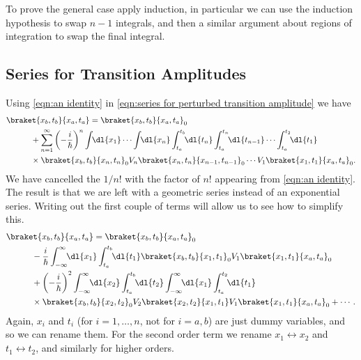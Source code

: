 \documentclass[fleqn]{NotesClass}
\begin{document}
    To prove the general case apply induction, in particular we can use the induction hypothesis to swap \(n - 1\) integrals, and then a similar argument about regions of integration to swap the final integral.
    
    \subsection{Series for Transition Amplitudes}
    Using \cref{eqn:an identity} in \cref{eqn:series for perturbed transition amplitude} we have
    \begin{align}\label{eqn:transition amplitude scattering series}
        &\braket{x_b, t_b}{x_a, t_a} = \braket{x_b, t_b}{x_a, t_a}_0 \notag\\
        &\quad\qquad {} + \sum_{n=1}^{\infty} \left( -\frac{i}{\hbar} \right)^n \int \!\! \dl{x_1} \dotsm \int \!\! \dl{x_n} \int_{t_a}^{t_b} \!\! \dl{t_n} \int_{t_a}^{t_n} \!\! \dl{t_{n-1}} \dotsm \int_{t_a}^{t_2} \!\! \dl{t_1} \notag\\
        &\quad\qquad \times \braket{x_b, t_b}{x_n, t_n}_0 V_n \braket{x_n, t_n}{x_{n-1}, t_{n-1}}_0 \dotsm V_1 \braket{x_1, t_1}{x_a, t_a}_0.
    \end{align}
    We have cancelled the \(1/n!\) with the factor of \(n!\) appearing from \cref{eqn:an identity}.
    The result is that we are left with a geometric series instead of an exponential series.
    Writing out the first couple of terms will allow us to see how to simplify this.
    \begin{align}
        &\braket{x_b, t_b}{x_a, t_a} = \braket{x_b, t_b}{x_a, t_a}_0\notag\\
        &\quad\qquad {} - \frac{i}{\hbar} \int_{-\infty}^{\infty} \!\! \dl{x_1} \int_{t_a}^{t_b} \!\! \dl{t_1} \braket{x_b, t_b}{x_1, t_1}_0 V_1 \braket{x_1, t_1}{x_a, t_a}_0\notag\\
        &\quad\qquad {} + \left( -\frac{i}{\hbar} \right)^2 \int_{-\infty}^{\infty} \!\! \dl{x_2} \int_{t_a}^{t_b} \!\! \dl{t_2} \int_{-\infty}^{\infty} \!\! \dl{x_1} \int_{t_a}^{t_2} \!\! \dl{t_1}\notag\\
        &\quad\qquad \times \braket{x_b, t_b}{x_2, t_2}_0 V_2 \braket{x_2, t_2}{x_1, t_1} V_1 \braket{x_1, t_1}{x_a, t_a}_0 + \dotsb.
    \end{align}
    Again, \(x_i\) and \(t_i\) (for \(i = 1, \dotsc, n\), not for \(i = a, b\)) are just dummy variables, and so we can rename them.
    For the second order term we rename \(x_1 \leftrightarrow x_2\) and \(t_1 \leftrightarrow t_2\), and similarly for higher orders.
\end{document}
